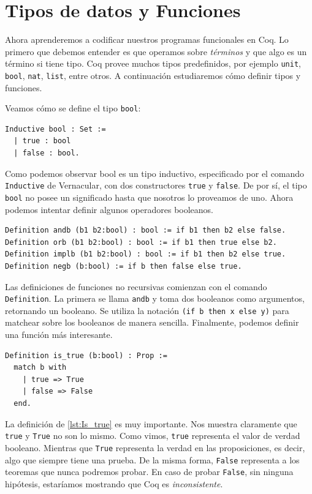 \section{Tipos de datos y Funciones}

Ahora aprenderemos a codificar nuestros programas funcionales en Coq. Lo primero que debemos entender es que operamos sobre \textit{términos} y que algo es un término si tiene tipo. Coq provee muchos tipos predefinidos, por ejemplo \lstinline{unit}, \lstinline{bool}, \lstinline{nat}, \lstinline{list}, entre otros. A continuación estudiaremos cómo definir tipos y funciones.

Veamos cómo se define el tipo \lstinline{bool}:

\begin{lstlisting}
Inductive bool : Set :=
  | true : bool
  | false : bool.
\end{lstlisting}

Como podemos observar bool es un tipo inductivo, especificado por el comando \lstinline{Inductive} de Vernacular, con dos constructores \lstinline{true} y \lstinline{false}. De por sí, el tipo \lstinline{bool} no posee un significado hasta que nosotros lo proveamos de uno. Ahora podemos intentar definir algunos operadores booleanos.
\begin{lstlisting}
Definition andb (b1 b2:bool) : bool := if b1 then b2 else false.
Definition orb (b1 b2:bool) : bool := if b1 then true else b2.
Definition implb (b1 b2:bool) : bool := if b1 then b2 else true.
Definition negb (b:bool) := if b then false else true.
\end{lstlisting}

Las definiciones de funciones no recursivas comienzan con el comando \lstinline{Definition}. La primera se llama \lstinline{andb} y toma dos booleanos como argumentos, retornando un booleano. Se utiliza la notación \lstinline{(if b then x else y)} para matchear sobre los booleanos de manera sencilla. Finalmente, podemos definir una función más interesante.

\begin{lstlisting}[frame=tb,caption={Definición de \lstinline{is_true}},label=lst:Is_true]
Definition is_true (b:bool) : Prop :=
  match b with
    | true => True
    | false => False
  end.
\end{lstlisting}

La definición de \ref{lst:Is_true} es muy importante. Nos muestra claramente que \lstinline{true} y \lstinline{True} no son lo mismo. Como vimos, \lstinline{true} representa el valor de verdad booleano. Mientras que \lstinline{True} representa la verdad en las proposiciones, es decir, algo que siempre tiene una prueba. De la misma forma, \lstinline{False} representa a los teoremas que nunca podremos probar. En caso de probar \lstinline{False}, sin ninguna hipótesis, estaríamos mostrando que Coq es \emph{inconsistente}.

